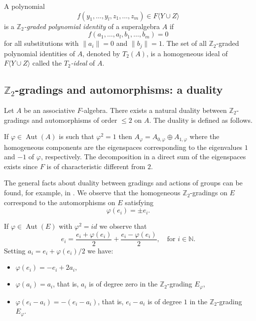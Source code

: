 \documentclass{article}
\begin{document}
	\medskip
	
	\noindent
	A polynomial
	\[
	f(y_1, \ldots, y_l, z_1, \ldots, z_m) \in F\langle Y \cup Z \rangle
	\]
	is a \emph{$\mathbb{Z}_2$-graded polynomial identity} of a superalgebra $A$ if
	\[
	f(a_1, \ldots, a_l, b_1, \ldots, b_m) = 0
	\]
	for all substitutions with $\|a_i\| = 0$ and $\|b_j\| = 1$. The set of all $\mathbb{Z}_2$-graded polynomial identities of $A$,
	denoted by $T_2(A)$, is a homogeneous ideal of $F\langle Y \cup Z \rangle$ called the \emph{$T_2$-ideal} of $A$.
	
	
	
	
	
	
	
	
	\subsection{$\mathbb{Z}_2$-gradings and automorphisms: a duality}
	
	Let $A$ be an associative $F$-algebra. There exists a natural duality between $\mathbb{Z}_2$-gradings and automorphisms of order 
	$\leq 2$ on $A$. The duality is defined as follows.
	
	If $\varphi \in \operatorname{Aut}(A)$ is such that $\varphi^2 = 1$ then $A_{\varphi} = A_{0,\varphi} \oplus A_{1,\varphi}$ where the homogeneous 
	components are the eigenspaces corresponding to the eigenvalues $1$ and $-1$ of $\varphi$, respectively. The decomposition in a direct sum 
	of the eigenspaces exists since $F$ is of characteristic different from $2$.
	
	The general facts about duality between gradings and actions of groups can be found, for example, in \cite{GMZ}. 
	We observe that the homogeneous $\mathbb{Z}_2$-gradings on $E$ correspond to the automorphisms on $E$ satisfying
	\[
	\varphi(e_i) = \pm e_i.
	\]
	
	If $\varphi \in \operatorname{Aut}(E)$ with $\varphi^2 = id$ we observe that
	\[
	e_i = \frac{e_i + \varphi(e_i)}{2} + \frac{e_i - \varphi(e_i)}{2}, \quad \text{for } i \in \mathbb{N}.
	\]
	Setting $a_i = e_i + \varphi(e_i)/2$ we have:
	\begin{itemize}
		\item $\varphi(e_i) = -e_i + 2a_i$,
		\item $\varphi(a_i) = a_i$, that is, $a_i$ is of degree zero in the $\mathbb{Z}_2$-grading $E_\varphi$,
		\item $\varphi(e_i - a_i) = -(e_i - a_i)$, that is, $e_i - a_i$ is of degree $1$ in the $\mathbb{Z}_2$-grading $E_\varphi$.
	\end{itemize}
	
\end{document}
